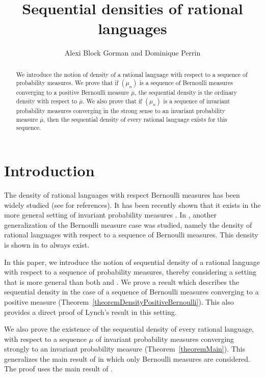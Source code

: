 \documentclass{article}[11pt]
\title{Sequential densities of rational languages}
\author{Alexi Block Gorman and Dominique Perrin}
\numberwithin{theorem}{section}
\numberwithin{equation}{section}
\numberwithin{figure}{section}
\numberwithin{table}{section}
\begin{document}
\maketitle

\begin{abstract}
We introduce the notion of  density of a rational language with respect to a sequence of probability measures. We prove that if $(\mu_n)$ is a sequence of Bernoulli measures converging to a positive Bernoulli measure $\overline{\mu}$, the sequential density is the ordinary density with respect to $\overline{\mu}$. We also prove that if $(\mu_n)$ is a sequence of invariant
probability measures converging in the strong sense to an invariant probability measure $\overline{\mu}$, then the sequential density of every rational language exists for this sequence.
\end{abstract}



\section{Introduction}
The density of rational languages with respect Bernoulli measures
has been widely studied (see \cite{BertheGouletOuelletNybergBroddaPerrinPetersen2024}
for references). 
It has been recently shown that it exists in the more general setting of invariant probability measures \cite{BertheGouletOuelletPerrin2025}.
In \cite{Lynch1993}, another generalization of the Bernoulli measure case was studied, namely the density of rational languages with respect to a sequence of Bernoulli measures.
This density is shown in \cite{Lynch1993} to always exist.

In this paper, we introduce the notion of sequential density of a rational language with respect to a sequence
of probability measures, thereby considering a setting that is more general than both
\cite{BertheGouletOuelletPerrin2025} and \cite{Lynch1993}.
We prove a result which describes the sequential density in the case of a sequence of Bernoulli measures
converging to a positive measure (Theorem~\ref{theoremDensityPositiveBernoulli}). 
This also provides a direct proof of Lynch's result in this setting.

We also prove the existence of the sequential density of every rational language,
with respect to a sequence $\mu$ of invariant probability measures converging strongly
to an invariant probability measure (Theorem~\ref{theoremMain}). This generalizes 
the main result of \cite{Lynch1993} in which only Bernoulli measures are considered.
The proof uses the main result of \cite{BertheGouletOuelletPerrin2025}.
\end{document}
